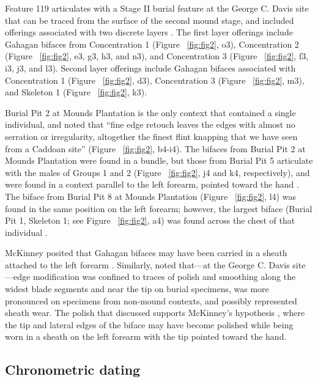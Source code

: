 \documentclass[review]{elsarticle}
\begin{document}
Feature 119 \citep[Figure 13-18]{RN808} articulates with a Stage II burial feature at the George C. Davis site that can be traced from the surface of the second mound stage, and included offerings associated with two discrete layers \citep{RN808,RN5050,RN806}. The first layer offerings include Gahagan bifaces from Concentration 1 (Figure ~\ref{fig:fig2}, o3), Concentration 2 (Figure ~\ref{fig:fig2}, e3, g3, h3, and n3), and Concentration 3 (Figure ~\ref{fig:fig2}, f3, i3, j3, and l3). Second layer offerings include Gahagan bifaces associated with Concentration 1 (Figure ~\ref{fig:fig2}, d3), Concentration 3 (Figure ~\ref{fig:fig2}, m3), and Skeleton 1 (Figure ~\ref{fig:fig2}, k3).

Burial Pit 2 at Mounds Plantation is the only context that contained a single individual, and \citet[97]{RN11561} noted that “fine edge retouch leaves the edges with almost no serration or irregularity, altogether the finest flint knapping that we have seen from a Caddoan site” (Figure ~\ref{fig:fig2}, b4-i4). The bifaces from Burial Pit 2 at Mounds Plantation were found in a bundle, but those from Burial Pit 5 articulate with the males of Groups 1 and 2 (Figure ~\ref{fig:fig2}, j4 and k4, respectively), and were found in a context parallel to the left forearm, pointed toward the hand \citep[Figure 5]{RN11561}. The biface from Burial Pit 8 at Mounds Plantation (Figure ~\ref{fig:fig2}, l4) was found in the same position on the left forearm; however, the largest biface (Burial Pit 1, Skeleton 1; see Figure ~\ref{fig:fig2}, a4) was found across the chest of that individual \citep{RN11561}.

McKinney posited that Gahagan bifaces may have been carried in a sheath attached to the left forearm \citep{RN11561}. Similarly, \citet{RN3684} noted that---at the George C. Davis site---edge modification was confined to traces of polish and smoothing along the widest blade segments and near the tip on burial specimens, was more pronounced on specimens from non-mound contexts, and possibly represented sheath wear. The polish that \citet{RN3684} discussed supports McKinney’s hypothesis \citep{RN11561}, where the tip and lateral edges of the biface may have become polished while being worn in a sheath on the left forearm with the tip pointed toward the hand.

\subsection*{Chronometric dating}
\end{document}
